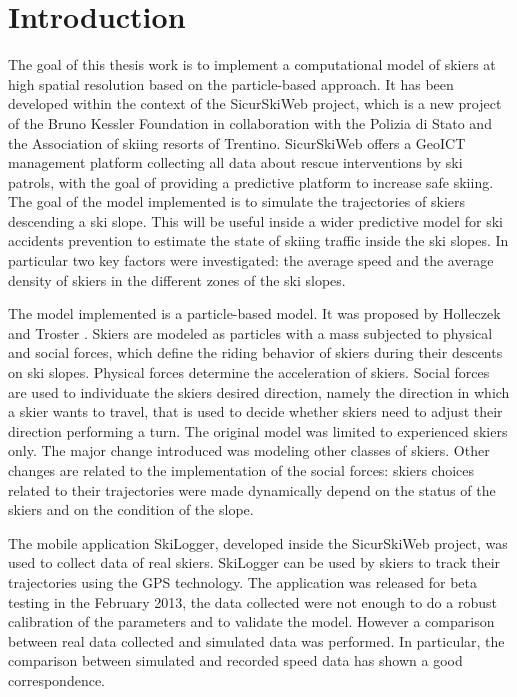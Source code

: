 \documentclass[12pt,a4paper,twoside]{book}
\begin{document}
\chapter*{Introduction}
The goal of this thesis work is to implement a computational model of skiers at high spatial resolution based on the particle-based approach. It has been developed within the context of the SicurSkiWeb project, which is a new project of the Bruno Kessler Foundation in collaboration with the Polizia di Stato and the Association of skiing resorts of Trentino. SicurSkiWeb offers a GeoICT management platform collecting all data about rescue interventions by ski patrols, with the goal of providing a predictive platform to increase safe skiing. The goal of the model implemented is to simulate the trajectories of skiers descending a ski slope. This will be useful inside a wider predictive model for ski accidents prevention to estimate the state of skiing traffic inside the ski slopes. In particular two key factors were investigated: the average speed and the average density of skiers in the different zones of the ski slopes.

The model implemented is a particle-based model. It was proposed by Holleczek and Troster \cite{hol2012}. Skiers are modeled as particles with a mass subjected to physical and social forces, which define the riding behavior of skiers during their descents on ski slopes. Physical forces determine the acceleration of skiers. Social forces are used to individuate the skiers desired direction, namely the direction in which a skier wants to travel, that is used to decide whether skiers need to adjust their direction performing a turn. The original model was limited to experienced skiers only. The major change introduced was modeling other classes of skiers. Other changes are related to the implementation of the social forces: skiers choices related to their trajectories were made dynamically depend on the status of the skiers and on the condition of the slope.

The mobile application SkiLogger, developed inside the SicurSkiWeb project, was used to collect data of real skiers. SkiLogger can be used by skiers to track their trajectories using the GPS technology. The application was released for beta testing in the February 2013, the data collected were not enough to do a robust calibration of the parameters and to validate the model. However a comparison between real data collected and simulated data was performed. In particular, the comparison between simulated and recorded speed data has shown a good correspondence.
\end{document}
